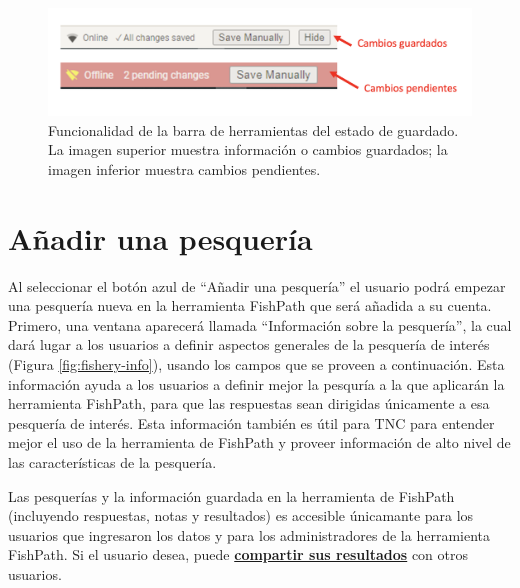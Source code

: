 \documentclass[
  11pt,
]{book}
\begin{document}
\begin{figure}

{\centering \includegraphics[width=0.95\linewidth]{images/saving-status-toolbar-es} 

}

\caption{Funcionalidad de la barra de herramientas del estado de guardado. La imagen superior muestra información o cambios guardados; la imagen inferior muestra cambios pendientes.}\label{fig:saving-status}
\end{figure}

\hypertarget{auxf1adir-una-pesqueruxeda}{%
\section{Añadir una pesquería}\label{auxf1adir-una-pesqueruxeda}}

Al seleccionar el botón azul de ``Añadir una pesquería'' el usuario podrá empezar una pesquería nueva en la herramienta FishPath que será añadida a su cuenta. Primero, una ventana aparecerá llamada ``Información sobre la pesquería'', la cual dará lugar a los usuarios a definir aspectos generales de la pesquería de interés (Figura \ref{fig:fishery-info}), usando los campos que se proveen a continuación. Esta información ayuda a los usuarios a definir mejor la pesquría a la que aplicarán la herramienta FishPath, para que las respuestas sean dirigidas únicamente a esa pesquería de interés. Esta información también es útil para TNC para entender mejor el uso de la herramienta de FishPath y proveer información de alto nivel de las características de la pesquería.

Las pesquerías y la información guardada en la herramienta de FishPath (incluyendo respuestas, notas y resultados) es accesible únicamante para los usuarios que ingresaron los datos y para los administradores de la herramienta FishPath. Si el usuario desea, puede \protect\hyperlink{Results-Actions}{\textbf{compartir sus resultados}} con otros usuarios.
\end{document}
